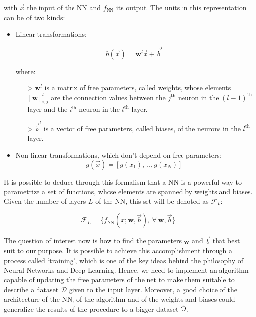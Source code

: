\noindent
with $\vec{x}$ the input of the NN and $f_\mathrm{NN}$ its output. The units in this representation can be of two kinds:
\begin{itemize}
    \item Linear transformations:
    
    \begin{equation}
        h(\vec{x}) = \mathbf{w}^l\vec{x} + \vec{b}^l
    \end{equation}
    
    \noindent
    where:
    \begin{itemize}
        \item[$\triangleright$] $\mathbf{w}^l$ is a matrix of free parameters, called weights, whose elements $[\mathbf{w}]_{i,j}^l$ are the connection values between the $j^\text{th}$ neuron in the $(l-1)^\text{th}$ layer and the $i^\text{th}$ neuron in the $l^\text{th}$ layer.
        \item[$\triangleright$] $\vec{b}^l$ is a vector of free parameters, called biases, of the neurons in the $l^\text{th}$ layer.
    \end{itemize}
    
    \item Non-linear transformations, which don't depend on free parameters:
    \begin{equation}
        g(\vec{x}) = [g(x_1),\dots,g(x_{N})]
    \end{equation}
\end{itemize}

It is possible to deduce through this formalism that a NN is a powerful way to parametrize a set of functions, whose elements are spanned by weights and biases. Given the number of layers $L$ of the NN, this set will be denoted as $\mathcal{F}_{L}$:

\begin{equation}
    \mathcal{F}_{L} = \{ f_\mathrm{NN}(x;\mathbf{w},\vec{b}), \ \forall \ \mathbf{w},\vec{b} \}
\end{equation}

The question of interest now is how to find the parameters $\mathbf{w}$ and $\vec{b}$ that best suit to our purpose. It is possible to achieve this accomplishment through a process called `training', which is one of the key ideas behind the philosophy of Neural Networks and Deep Learning. Hence, we need to implement an algorithm capable of updating the free parameters of the net to make them suitable to describe a dataset $\mathcal{D}$ given to the input layer. Moreover, a good choice of the architecture of the NN, of the algorithm and of the weights and biases could generalize the results of the procedure to a bigger dataset $\Tilde{\mathcal{D}}$.


